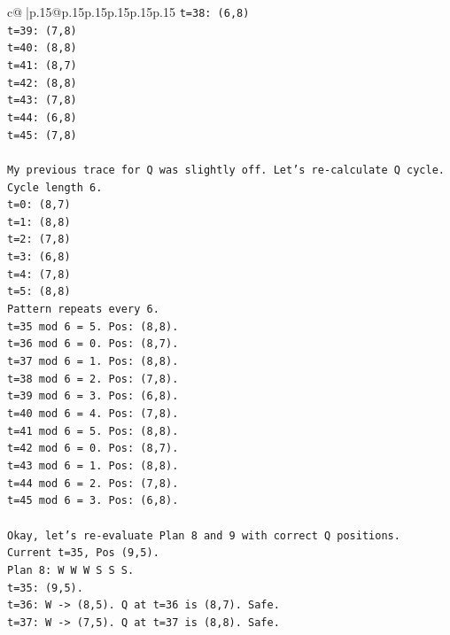 \documentclass{article}
\begin{document}
{\begin{supertabular}{c@{$\;$}|p{.15\linewidth}@{}p{.15\linewidth}p{.15\linewidth}p{.15\linewidth}p{.15\linewidth}p{.15\linewidth}}
{{{\texttt{t=38: (6,8)} \\
\texttt{t=39: (7,8)} \\
\texttt{t=40: (8,8)} \\
\texttt{t=41: (8,7)} \\
\texttt{t=42: (8,8)} \\
\texttt{t=43: (7,8)} \\
\texttt{t=44: (6,8)} \\
\texttt{t=45: (7,8)} \\
\\ 
\texttt{My previous trace for Q was slightly off. Let's re{-}calculate Q cycle.} \\
\texttt{Cycle length 6.} \\
\texttt{t=0: (8,7)} \\
\texttt{t=1: (8,8)} \\
\texttt{t=2: (7,8)} \\
\texttt{t=3: (6,8)} \\
\texttt{t=4: (7,8)} \\
\texttt{t=5: (8,8)} \\
\texttt{Pattern repeats every 6.} \\
\texttt{t=35 mod 6 = 5. Pos: (8,8).} \\
\texttt{t=36 mod 6 = 0. Pos: (8,7).} \\
\texttt{t=37 mod 6 = 1. Pos: (8,8).} \\
\texttt{t=38 mod 6 = 2. Pos: (7,8).} \\
\texttt{t=39 mod 6 = 3. Pos: (6,8).} \\
\texttt{t=40 mod 6 = 4. Pos: (7,8).} \\
\texttt{t=41 mod 6 = 5. Pos: (8,8).} \\
\texttt{t=42 mod 6 = 0. Pos: (8,7).} \\
\texttt{t=43 mod 6 = 1. Pos: (8,8).} \\
\texttt{t=44 mod 6 = 2. Pos: (7,8).} \\
\texttt{t=45 mod 6 = 3. Pos: (6,8).} \\
\\ 
\texttt{Okay, let's re{-}evaluate Plan 8 and 9 with correct Q positions.} \\
\texttt{Current t=35, Pos (9,5).} \\
\texttt{Plan 8: W W W S S S.} \\
\texttt{t=35: (9,5).} \\
\texttt{t=36: W {-}> (8,5). Q at t=36 is (8,7). Safe.} \\
\texttt{t=37: W {-}> (7,5). Q at t=37 is (8,8). Safe.} \\
}}}
\end{supertabular}}
\end{document}
